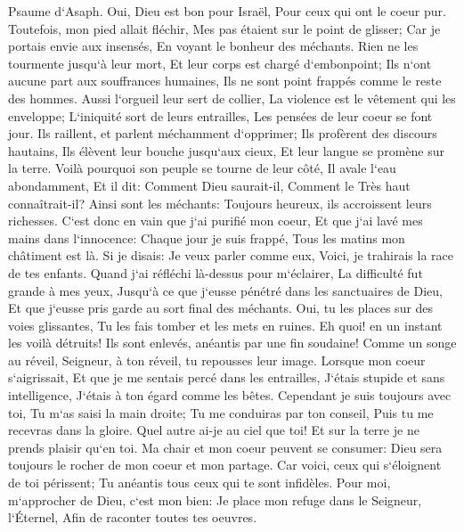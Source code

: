 \verse Psaume d`Asaph. Oui, Dieu est bon pour Israël, Pour ceux qui ont le coeur pur. 
\verse Toutefois, mon pied allait fléchir, Mes pas étaient sur le point de glisser; 
\verse Car je portais envie aux insensés, En voyant le bonheur des méchants. 
\verse Rien ne les tourmente jusqu`à leur mort, Et leur corps est chargé d`embonpoint; 
\verse Ils n`ont aucune part aux souffrances humaines, Ils ne sont point frappés comme le reste des hommes. 
\verse Aussi l`orgueil leur sert de collier, La violence est le vêtement qui les enveloppe; 
\verse L`iniquité sort de leurs entrailles, Les pensées de leur coeur se font jour. 
\verse Ils raillent, et parlent méchamment d`opprimer; Ils profèrent des discours hautains, 
\verse Ils élèvent leur bouche jusqu`aux cieux, Et leur langue se promène sur la terre. 
\verse Voilà pourquoi son peuple se tourne de leur côté, Il avale l`eau abondamment, 
\verse Et il dit: Comment Dieu saurait-il, Comment le Très haut connaîtrait-il? 
\verse Ainsi sont les méchants: Toujours heureux, ils accroissent leurs richesses. 
\verse C`est donc en vain que j`ai purifié mon coeur, Et que j`ai lavé mes mains dans l`innocence: 
\verse Chaque jour je suis frappé, Tous les matins mon châtiment est là. 
\verse Si je disais: Je veux parler comme eux, Voici, je trahirais la race de tes enfants. 
\verse Quand j`ai réfléchi là-dessus pour m`éclairer, La difficulté fut grande à mes yeux, 
\verse Jusqu`à ce que j`eusse pénétré dans les sanctuaires de Dieu, Et que j`eusse pris garde au sort final des méchants. 
\verse Oui, tu les places sur des voies glissantes, Tu les fais tomber et les mets en ruines. 
\verse Eh quoi! en un instant les voilà détruits! Ils sont enlevés, anéantis par une fin soudaine! 
\verse Comme un songe au réveil, Seigneur, à ton réveil, tu repousses leur image. 
\verse Lorsque mon coeur s`aigrissait, Et que je me sentais percé dans les entrailles, 
\verse J`étais stupide et sans intelligence, J`étais à ton égard comme les bêtes. 
\verse Cependant je suis toujours avec toi, Tu m`as saisi la main droite; 
\verse Tu me conduiras par ton conseil, Puis tu me recevras dans la gloire. 
\verse Quel autre ai-je au ciel que toi! Et sur la terre je ne prends plaisir qu`en toi. 
\verse Ma chair et mon coeur peuvent se consumer: Dieu sera toujours le rocher de mon coeur et mon partage. 
\verse Car voici, ceux qui s`éloignent de toi périssent; Tu anéantis tous ceux qui te sont infidèles. 
\verse Pour moi, m`approcher de Dieu, c`est mon bien: Je place mon refuge dans le Seigneur, l`Éternel, Afin de raconter toutes tes oeuvres. 

